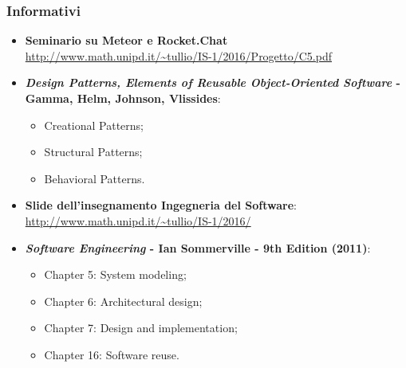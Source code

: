 \subsubsection{Informativi}
\begin{itemize}
	\item \textbf{Seminario su Meteor e Rocket.Chat}\\ \url{http://www.math.unipd.it/~tullio/IS-1/2016/Progetto/C5.pdf}
	\item \textbf{\textit{Design Patterns, Elements of Reusable Object-Oriented Software} - Gamma, Helm, Johnson, Vlissides}:
	\begin{itemize}
		\item Creational Patterns;
		\item Structural Patterns;
		\item Behavioral Patterns.
	\end{itemize}
	\item \textbf{Slide dell'insegnamento Ingegneria del Software}:\\
	\url{http://www.math.unipd.it/~tullio/IS-1/2016/}
	\item \textbf{\textit{Software Engineering} - Ian Sommerville - 9th Edition (2011)}:
	\begin{itemize}
		\item Chapter 5: System modeling;
		\item Chapter 6: Architectural design;
		\item Chapter 7: Design and implementation;
		\item Chapter 16: Software reuse.
	\end{itemize}  
\end{itemize}
